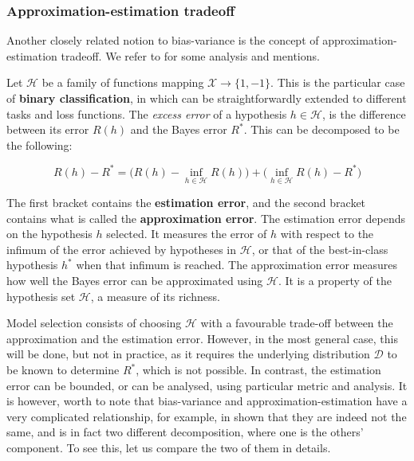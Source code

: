 \subsubsection{Approximation-estimation tradeoff}

Another closely related notion to bias-variance is the concept of approximation-estimation tradeoff. We refer to \cite{10.5555/2371238,lafon_understanding_2024} for some analysis and mentions. 

Let $\mathcal{H}$ be a family of functions mapping $\mathcal{X}\to\{1,-1\}$. This is the particular case of \textbf{binary classification}, in which can be straightforwardly extended to different tasks and loss functions. The \textit{excess error} of a hypothesis $h\in\mathcal{H}$, is the difference between its error $R(h)$ and the Bayes error $R^{*}$. This can be decomposed to be the following: 

\begin{equation}
    R(h) - R^{*} = \Big( R(h) - \inf_{h\in \mathcal{H}} R(h) \Big) + \Big( \inf_{h\in \mathcal{H}} R(h) - R^{*} \Big)
\end{equation}

The first bracket contains the \textbf{estimation error}, and the second bracket contains what is called the \textbf{approximation error}. The estimation error depends on the hypothesis $h$ selected. It measures the error of $h$ with respect to the infimum of the error achieved by hypotheses in $\mathcal{H}$, or that of the best-in-class hypothesis $h^{*}$ when that infimum is reached. The approximation error measures how well the Bayes error can be approximated using $\mathcal{H}$. It is a property of the hypothesis set $\mathcal{H}$, a measure of its richness. 

Model selection consists of choosing $\mathcal{H}$ with a favourable trade-off between the approximation and the estimation error. However, in the most general case, this will be done, but not in practice, as it requires the underlying distribution $\mathcal{D}$ to be known to determine $R^{*}$, which is not possible. In contrast, the estimation error can be bounded, or can be analysed, using particular metric and analysis. It is however, worth to note that bias-variance and approximation-estimation have a very complicated relationship, for example, in \cite{brown2024biasvariance} shown that they are indeed not the same, and is in fact two different decomposition, where one is the others' component. To see this, let us compare the two of them in details. 

